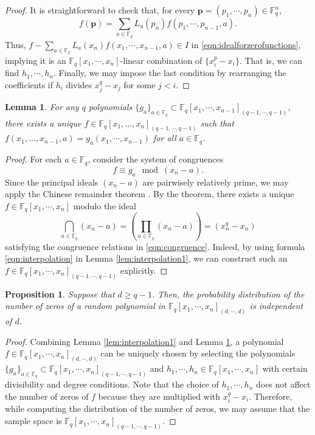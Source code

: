 \documentclass[12pt]{amsart}
\newtheorem{proposition}[theorem]{Proposition}
\newtheorem{lemma}[theorem]{Lemma}
\theoremstyle{definition}
\newcommand{\FF}{\mathbb{F} }
\newcommand{\bp}{\mathbf{p} }
\begin{document}
\begin{proof}
It is straightforward to check that, for every $\bp = (p_1, \cdots, p_n)\in \FF_q^n$, 
\[
    f(\bp) = \sum_{a \in \FF_q}L_a(p_n)f(p_1, \cdots, p_{n-1}, a).
\]
Thus, $f - \sum_{a \in \FF_q}L_a(x_n)f(x_1, \cdots, x_{n-1}, a) \in I$ in \eqref{eqn:idealforzerofunctions}, implying it is an $\FF_q[x_1, \cdots, x_n]$-linear combination of $\{x_i^p - x_i\}$. That is, we can find $h_1, \cdots, h_n$. Finally, we may impose the last condition by rearranging the coefficients if $h_i$ divides $x_j^q - x_j$ for some $j < i$.
\end{proof}

\begin{lemma}\label{lem:interpolation2}
For any $q$ polynomials $\{g_a\}_{a \in \FF_q} \subset \FF_q[x_1, \cdots, x_{n-1}]_{(q-1, \cdots, q-1)}$, there exists a unique $f \in \FF_q[x_1, ..., x_n]_{(q-1, \cdots, q-1)}$ such that $f(x_1,..., x_{n-1}, a) = g_a(x_1,\cdots, x_{n-1})$ for all $a \in \FF_q$.
\end{lemma}

\begin{proof}
For each $a \in \FF_q$, consider the system of congruences
\begin{equation}\label{eqn:congruence}
   f \equiv g_a \mod{(x_n - a)}. 
\end{equation}
Since the principal ideals $(x_n - a)$ are pairwisely relatively prime, we may apply the Chinese remainder theorem \cite[Theorem III.2.25]{Hun80}. By the theorem, there exists a unique $f \in \FF_q[x_1, \cdots, x_n]$ modulo the ideal 
\[
    \bigcap_{a \in \FF_q}(x_n - a) = (\prod_{a \in \FF_q}(x_n - a)) = (x_n^q - x_n)
\]
satisfying the congruence relations in \eqref{eqn:congruence}. Indeed, by using formula \eqref{eqn:interpolation} in Lemma \ref{lem:interpolation1}, we can construct such an $f \in \FF_q[x_1, \cdots, x_n]_{(q-1, \cdots, q-1)}$ explicitly. 
\end{proof}

 \begin{proposition}\label{prop:stablizeddistribution}
Suppose that $d \ge q-1$. Then, the probability distribution of the number of zeros of a random polynomial in $\FF_q[x_1, \cdots, x_n]_{(d, \cdots, d)}$ is independent of $d$. 
\end{proposition}

\begin{proof}
Combining Lemma \ref{lem:interpolation1} and Lemma \ref{lem:interpolation2}, a polynomial $f \in \FF_q[x_1, \cdots, x_n]_{(d, \cdots, d)}$ can be uniquely chosen by selecting the polynomials $\{g_a\}_{a \in \FF_q} \subset \FF_q[x_1, \cdots, x_n]_{(q-1, \cdots, q-1)}$ and $h_1, \cdots, h_n \in \FF_q[x_1, \cdots, x_n]$ with certain divisibility and degree conditions. Note that the choice of $h_1, \cdots, h_n$ does not affect the number of zeros of $f$ because they are multiplied with $x_i^q - x_i$.  Therefore, while computing the distribution of the number of zeros, we may assume that the sample space is $\FF_q[x_1, \cdots, x_n]_{(q-1, \cdots, q-1)}$. 
\end{proof}
\end{document}
